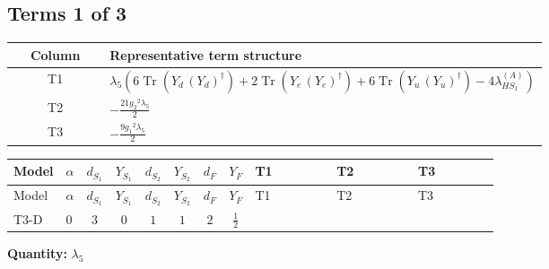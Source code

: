 \documentclass[8pt]{article}
\begin{document}
\begin{landscape}
\subsection*{Terms 1 of 3}
\begin{center}
\begin{tabular}{@{}c >{\raggedright\arraybackslash}p{0.82\linewidth}@{}}
\toprule
Column & Representative term structure \\
\midrule
T1 & \(\displaystyle {\lambda_5} (6 \operatorname{Tr}\!\left({Y_d}\,\left({Y_d}\right)^{\dagger}\right)+2 \operatorname{Tr}\!\left({Y_e}\,\left({Y_e}\right)^{\dagger}\right)+6 \operatorname{Tr}\!\left({Y_u}\,\left({Y_u}\right)^{\dagger}\right)-4 {\lambda_{HS_1}^{(A)}})\) \\
\midrule
T2 & \(\displaystyle -\frac{21 {g_2}^2 {\lambda_5}}{2}\) \\
\midrule
T3 & \(\displaystyle -\frac{9 {g_1}^2 {\lambda_5}}{2}\) \\
\midrule
\bottomrule
\end{tabular}
\end{center}
\smallskip
\tiny
\begin{longtable}{@{}llcccccc >{\raggedright\arraybackslash}p{0.21\linewidth} >{\raggedright\arraybackslash}p{0.21\linewidth} >{\raggedright\arraybackslash}p{0.21\linewidth}@{}}
\toprule
Model & $\alpha$ & $d_{S_1}$ & $Y_{S_1}$ & $d_{S_2}$ & $Y_{S_2}$ & $d_F$ & $Y_F$ & T1 & T2 & T3 \\
\midrule
\endfirsthead
\toprule
Model & $\alpha$ & $d_{S_1}$ & $Y_{S_1}$ & $d_{S_2}$ & $Y_{S_2}$ & $d_F$ & $Y_F$ & T1 & T2 & T3 \\
\midrule
\endhead
T3-D & $0$ & $3$ & $0$ & $1$ & $1$ & $2$ & $\frac{1}{2}$ & \scriptsize\adjustbox{max width=\linewidth}{$\begin{gathered} {\lambda_5} (6 \operatorname{Tr}\!\left({Y_d}\,\left({Y_d}\right)^{\dagger}\right)+2 \operatorname{Tr}\!\left({Y_e}\,\left({Y_e}\right)^{\dagger}\right)+6 \operatorname{Tr}\!\left({Y_u}\,\left({Y_u}\right)^{\dagger}\right)-4 {\lambda_{HS_1}^{(A)}})\end{gathered}$} & \scriptsize\adjustbox{max width=\linewidth}{$\begin{gathered} -\frac{21 {g_2}^2 {\lambda_5}}{2}\end{gathered}$} & \scriptsize\adjustbox{max width=\linewidth}{$\begin{gathered} -\frac{9 {g_1}^2 {\lambda_5}}{2}\end{gathered}$} \\
\midrule
\bottomrule
\end{longtable}
\clearpage
\noindent\textbf{Quantity: }$\lambda_5$\par\smallskip

\end{landscape}
\end{document}

